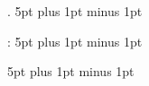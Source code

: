 

\usepackage[
nonumberlist, %
acronym,      %
toc,          %
nopostdot]
{glossaries}

\usepackage{textcase}

\makeindex

\makeglossaries



    {\parskip}   %
    {\parskip}   %
    {\bfseries}  %
    {}       %
    {\bfseries\scshape} %
    {.}         %
    {5pt plus 1pt minus 1pt} %
    {}          %
  
    {\parskip\parskip}   %
    {\parskip\parskip}   %
    {}  %
    {}       %
    {} %
    {:}         %
    {5pt plus 1pt minus 1pt} %
    {}          %
  
    {\parskip}   %
    {\parskip}   %
    {}  %
    {}       %
    {\bfseries} %
    {}         %
    {5pt plus 1pt minus 1pt} %
    {}          %

\newenvironment{core}
    {\begin{adjustwidth}{0.8cm}{0.8cm}}
    {\end{adjustwidth}}
    
\newcommand{\thesisline}{%
    \noindent
    \begin{center}
        \vspace{0.3cm}
    --- $\bullet$ ---
    \end{center}
}